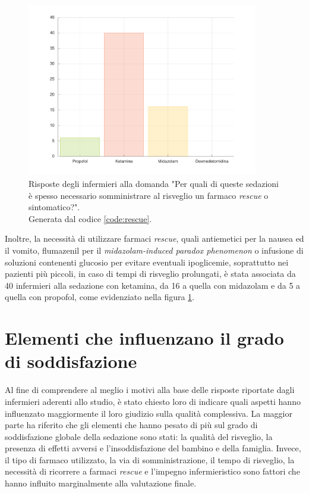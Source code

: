 

\begin{figure}[!h]
    \centering
    \includegraphics[width=0.9\textwidth]{Figure/rescue.pdf}
    \caption{Risposte degli infermieri alla domanda "Per quali di queste sedazioni è spesso necessario somministrare al risveglio un farmaco \emph{rescue} o sintomatico?".\\ Generata dal codice \ref{code:rescue}.}
    \label{fig:rescue}
\end{figure}

Inoltre, la necessità di utilizzare farmaci \emph{rescue}, quali antiemetici per la nausea ed il vomito, flumazenil per il \emph{midazolam-induced paradox phenomenon} o infusione di soluzioni contenenti glucosio per evitare eventuali ipoglicemie, soprattutto nei pazienti più piccoli, in caso di tempi di risveglio prolungati, è stata associata da 40 infermieri alla sedazione con ketamina, da 16 a quella con midazolam e da 5 a quella con propofol, come evidenziato nella figura \ref{fig:rescue}.


\section{Elementi che influenzano il grado di soddisfazione}

Al fine di comprendere al meglio i motivi alla base delle risposte riportate dagli infermieri aderenti allo studio, è stato chiesto loro di indicare quali aspetti hanno influenzato maggiormente il loro giudizio sulla qualità complessiva. La maggior parte ha riferito che gli elementi che hanno pesato di più sul grado di soddisfazione globale della sedazione sono stati: la qualità del risveglio, la presenza di effetti avversi e l'insoddisfazione del bambino e della famiglia. Invece, il tipo di farmaco utilizzato, la via di somministrazione, il tempo di risveglio, la necessità di ricorrere a farmaci \emph{rescue} e l'impegno infermieristico sono fattori che hanno influito marginalmente alla valutazione finale.

